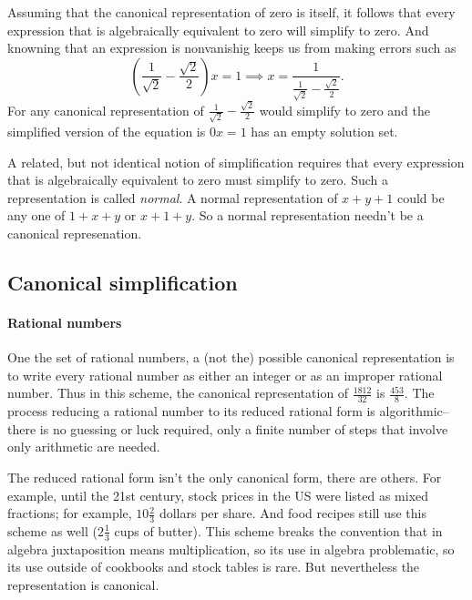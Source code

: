 \documentclass[12pt,fleqn]{article}
\begin{document}
Assuming that the canonical representation of zero is itself, it follows that every expression that is algebraically equivalent to zero will
simplify to zero. And knowning that an expression is nonvanishig keeps us from making errors such as
\begin{equation}
  \left(\frac{1}{\sqrt{2}} - \frac{\sqrt{2}}{2} \right) x = 1  \implies  x = \frac{1}{\frac{1}{\sqrt{2}} - \frac{\sqrt{2}}{2}}.
\end{equation}
For any canonical representation of \(\frac{1}{\sqrt{2}} - \frac{\sqrt{2}}{2} \) would simplify to zero and the simplified version of the equation
is \( 0 x  = 1\) has an empty solution set.

A related, but not identical notion of simplification requires that every expression that is algebraically equivalent to zero must simplify to zero. Such a representation is called \emph{normal}.  A normal representation of $ x+y+1$ could be any one of $1+x+y$ or $x + 1 + y$. So a normal representation needn't be a canonical represenation. 

\subsection*{Canonical simplification}



\paragraph{Rational numbers} One the set of rational numbers, a (not the) possible canonical representation  is to write every rational number as either an integer or as an improper
rational number.  Thus in this scheme, the canonical representation of $\frac{1812}{32}$ is  $\frac{453}{8}$. The process reducing a rational
number to its reduced rational  form is algorithmic--there is no guessing or luck required, only a finite number of steps that  involve only arithmetic are needed.

The reduced rational form isn't the only canonical form, there are others. For example, until the 21st century, stock prices in the US were listed as mixed fractions; for example, $10 \frac{2}{3}$ dollars per share. And food recipes still use this scheme as well ($2 \frac{1}{3}$ cups of butter). This scheme 
breaks the  convention that in algebra juxtaposition means multiplication, so its use in algebra problematic, so its use outside of cookbooks and stock tables is rare. But
nevertheless the representation is canonical.
\end{document}
